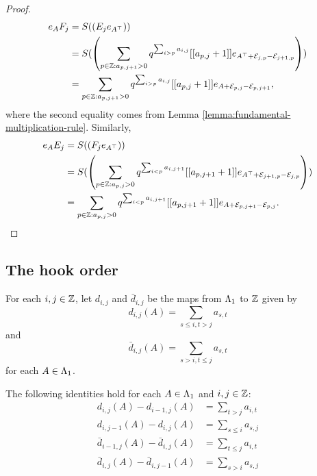 \documentclass[a4paper, 11pt, twoside]{report}
\begin{document}
\begin{proof}
\begin{align*}
e_AF_j
&= S{(\left(E_j e_{A^\top}\right))}\\
&= S{(\left(\sum_{p\in\mathbb{Z}: a_{p,j+1}>0} q^{\sum_{i>p} a_{i,j}} [[a_{p,j}+1]] e_{A^\top +\mathcal{E}_{j,p} -\mathcal{E}_{j+1,p}}\right))}\\
&= \sum_{p\in\mathbb{Z}: a_{p,j+1}>0} q^{\sum_{i>p}a_{i,j}} [[a_{p,j}+1]] e_{A+\mathcal{E}_{p,j}-\mathcal{E}_{p,j+1}},
\end{align*}
where the second equality comes from Lemma \ref{lemma:fundamental-multiplication-rule}. Similarly,
\begin{align*}
e_AE_j
&= S{(\left(F_j e_{A^\top}\right))}\\
&= S{(\left( \sum_{p\in\mathbb{Z}:a_{p,j}>0} q^{\sum_{i<p} a_{i,j+1}} [[a_{p,j+1}+1]] e_{A^\top +\mathcal{E}_{j+1,p} - \mathcal{E}_{j,p}}\right))}\\
&= \sum_{p\in\mathbb{Z}: a_{p,j}>0} q^{\sum_{i<p}a_{i,j+1}} [[a_{p,j+1}+1]] e_{A+\mathcal{E}_{p,j+1} -\mathcal{E}_{p,j}}.
\end{align*}
\end{proof}


\subsection{The hook order}

For each $i,j\in\mathbb{Z}$, let $d_{i,j}$ and $\bar{d}_{i,j}$ be the maps from $\Lambda_1{}$ to $\mathbb{Z}$ given by
\begin{equation*}
d_{i,j}{(A)} = \sum_{s\le i,t>j} a_{s,t}
\end{equation*}
and
\begin{equation*}
\bar{d}_{i,j}{(A)} = \sum_{s>i, t\le j} a_{s,t}
\end{equation*}
for each $A\in\Lambda_1{}$.

\begin{lemma}\label{lemma:differentials}
The following identities hold for each $A\in\Lambda_1{}$ and $i,j\in\mathbb{Z}$:
\begin{align*}
d_{i,j}{(A)} - d_{i-1,j}{(A)} &= \sum_{t>j} a_{i,t}\\
d_{i,j-1}{(A)}-d_{i,j}{(A)} &= \sum_{s\le i} a_{s,j}\\
\bar{d}_{i-1,j}{(A)} - \bar{d}_{i,j}{(A)} &= \sum_{t\le j} a_{i,t}\\
\bar{d}_{i,j}{(A)} - \bar{d}_{i,j-1}{(A)} &= \sum_{s>i} a_{s,j}
\end{align*}
\end{lemma}
\end{document}
